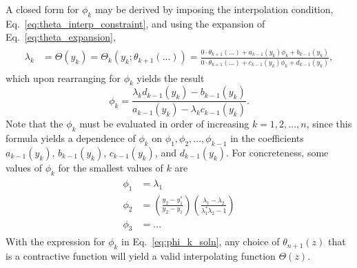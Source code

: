 A closed form for $\phi_k$ may be derived by imposing the interpolation condition, Eq.~\eqref{eq:theta_interp_constraint}, and using the expansion of Eq.~\eqref{eq:theta_expansion},
\begin{align}
    \begin{split}
        \lambda_k &= \Theta(y_k) = \Theta_k(y_k; \theta_{k + 1}(...)) = \frac{0\cdot \theta_{k + 1}(...) + a_{k-1}(y_k) \phi_k + b_{k-1}(y_k)}{0\cdot \theta_{k + 1}(...) + c_{k-1}(y_k) \phi_k + d_{k-1}(y_k)},
    \end{split}
\end{align}
which upon rearranging for $\phi_k$ yields the result
\begin{equation}
    \phi_k = \frac{\lambda_k d_{k-1}(y_k) - b_{k-1}(y_k)}{a_{k-1}(y_k) - \lambda_k c_{k-1}(y_k)}.
    \label{eq:phi_k_soln}
\end{equation}
Note that the $\phi_k$ must be evaluated in order of increasing $k = 1, 2, ..., n$, since this formula yields a dependence of $\phi_k$ on $\phi_1, \phi_2, ..., \phi_{k - 1}$ in the coefficients $a_{k-1}(y_k)$, $b_{k-1}(y_k)$, $c_{k-1}(y_k)$, and $d_{k-1}(y_k)$. For concreteness, some values of $\phi_k$ for the smallest values of $k$ are
\begin{align}
    \begin{split}
        \phi_1 &= \lambda_1 \\
        \phi_2 &= \left(\frac{y_2 - y_1^*}{y_2 - y_1}\right) \left( \frac{\lambda_1 - \lambda_2}{\lambda_1^* \lambda_2 - 1} \right) \\
        \phi_3 &= ...
    \end{split}
\end{align}
With the expression for $\phi_k$ in Eq.~\eqref{eq:phi_k_soln}, any choice of $\theta_{n + 1}(z)$ that is a contractive function will yield a valid interpolating function $\Theta(z)$. 


